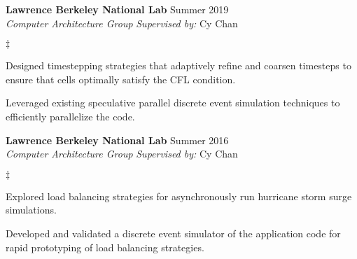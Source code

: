 \documentclass[margin,line]{res}
\newenvironment{list2}{
  \begin{list}{$\ddagger$}{%
      \setlength{\itemsep}{0in}
      \setlength{\parsep}{0in} \setlength{\parskip}{0in}
      \setlength{\topsep}{0in} \setlength{\partopsep}{0in}
      \setlength{\leftmargin}{0.2in}}}{\end{list}}
\begin{document}
\begin{resume}
\textbf{Lawrence Berkeley National Lab} \hfill Summer 2019\\
\textit{Computer Architecture Group} \hfill {\it Supervised by:} Cy Chan\\
\vspace{-0.1in}
\begin{list2}
\item Designed timestepping strategies that adaptively refine and coarsen timesteps to ensure that cells optimally satisfy the CFL condition.
\item Leveraged existing speculative parallel discrete event simulation techniques to efficiently parallelize the code.
\end{list2}

\textbf{Lawrence Berkeley National Lab} \hfill Summer 2016\\
\textit{Computer Architecture Group} \hfill {\it Supervised by:} Cy Chan\\
\vspace{-0.1in}
\begin{list2}
\item Explored load balancing strategies for asynchronously run hurricane storm surge simulations.
\item Developed and validated a discrete event simulator of the application code for rapid prototyping of load balancing strategies.
\end{list2}




\end{resume}
\end{document}
